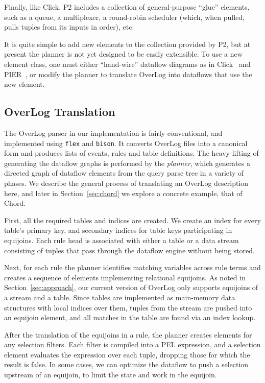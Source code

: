 \documentclass{sig-alt-full}
\def\Sys{P2\xspace}
\def\Lang{OverLog\xspace}
\def\ELang{PEL\xspace}
\def\Elang{\ELang}
\begin{document}
Finally, like Click, \Sys includes a collection of general-purpose
``glue'' elements, such as a queue, a multiplexer, a round-robin
scheduler (which, when pulled, pulls tuples from its inputs in
order), etc. 

It is quite simple to add new elements to the collection provided by
\Sys, but at present the planner is not yet designed to be easily
extensible.  To use a new element class, one must either
``hand-wire'' dataflow diagrams as in Click~\cite{click-tocs} and
PIER~\cite{pier-cidr}, or modify the planner to
translate \Lang into dataflows that use the new element.

\subsection{\Lang Translation}
\label{sec:planner}

The \Lang parser in our implementation is fairly conventional, and
implemented using \texttt{flex} and \texttt{bison}.  It converts 
\Lang files into a canonical form and produces lists of events,
rules and table definitions.   The heavy lifting of generating the
dataflow graphs is performed by the \textit{planner},
which generates a directed graph of dataflow elements from the query
parse tree in a variety of phases.   We describe the general process
of translating an \Lang description here, and later in
Section~\ref{sec:chord} we explore a concrete example, that of Chord. 

First, all the required tables and indices are created.  We create an
index for every table's primary key, and secondary indices for table
keys participating in equijoins.  Each
rule head is associated with either a table or a 
data stream consisting of tuples that pass through the dataflow engine without
being stored. 

Next, for each rule the planner identifies matching variables across
rule terms and creates a sequence of elements implementing relational
equijoins.  As noted in Section~\ref{sec:approach}, our current
version of OverLog only supports equijoins of a stream and a table.
Since tables are implemented as main-memory data structures with
local indices over them, tuples from the
stream are pushed into an equijoin element, and all matches in the
table are found via an index lookup. 

After the translation of the equijoins in a rule, the planner creates
elements for any selection filters.  Each filter is compiled into
a \Elang expression, and a selection element evaluates the expression
over each tuple, dropping those for which the result is false.  In
some cases, we can optimize the dataflow to push a selection upstream of
an equijoin, to limit the state and work in the equijoin. 
\end{document}
